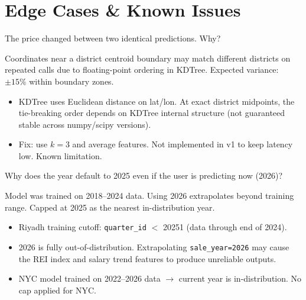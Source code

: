 \documentclass[11pt, a4paper, twoside]{article}
\begin{document}
\section{Edge Cases \& Known Issues}
\label{sec:edge}

\begin{question}{The price changed between two identical predictions. Why?}
\begin{shortanswer}
Coordinates near a district centroid boundary may match different districts on
repeated calls due to floating-point ordering in KDTree. Expected variance:
$\pm 15\%$ within boundary zones.
\end{shortanswer}

\begin{detail}
\begin{itemize}
  \item KDTree uses Euclidean distance on lat/lon. At exact district midpoints,
        the tie-breaking order depends on KDTree internal structure (not
        guaranteed stable across numpy/scipy versions).
  \item Fix: use $k=3$ and average features. Not implemented in v1 to keep
        latency low. Known limitation.
\end{itemize}
\end{detail}
\end{question}

\bigskip

\begin{question}{Why does the year default to 2025 even if the user is predicting now (2026)?}
\begin{shortanswer}
Model was trained on 2018--2024 data. Using 2026 extrapolates beyond training
range. Capped at 2025 as the nearest in-distribution year.
\end{shortanswer}

\begin{detail}
\begin{itemize}
  \item Riyadh training cutoff: \texttt{quarter\_id} $<$ 20251 (data through
        end of 2024).
  \item 2026 is fully out-of-distribution. Extrapolating \texttt{sale\_year=2026}
        may cause the REI index and salary trend features to produce unreliable
        outputs.
  \item NYC model trained on 2022--2026 data $\to$ current year is
        in-distribution. No cap applied for NYC.
\end{itemize}
\end{detail}
\end{question}
\end{document}
